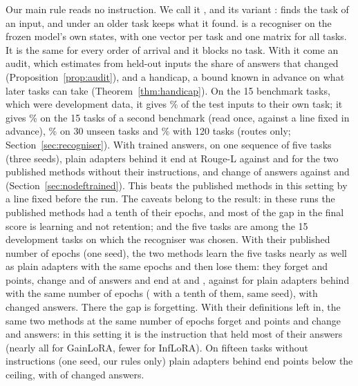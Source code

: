 Our main rule reads no instruction. We call it \recog{}, and its variant \handicap{}: \recog{} finds the
task of an input, and under \handicap{} an older task keeps what it found. \recog{} is a recogniser on the frozen model's own states, with
one vector per task and one matrix for all tasks. It is the same for every order of arrival and it blocks no
task. With it come an audit, which estimates from held-out inputs the share of answers that
changed (Proposition~\ref{prop:audit}), and a handicap, a bound known in advance on what later tasks
can take (Theorem~\ref{thm:handicap}). On the 15 benchmark tasks, which were development data, it
gives \AudDevLLamOneEnd{}\% of the test inputs to their own task; it gives \AudScaleLongThreeEnd{}\%
on the 15 tasks of a second benchmark (read once, against a line fixed in advance),
\AudFreshFourthLEnd{}\% on 30 unseen tasks and
\AudScaleAllHundredTwentyEnd{}\% with 120 tasks (routes only; Section~\ref{sec:recogniser}). With
trained answers, on one sequence of five tasks (three seeds), plain adapters behind it end at
\AudSeedsRidgeAPOne{} Rouge-L against \AudSeedsGainloraAPOne{} and \AudSeedsInfloraAPOne{} for the
two published methods without their instructions, and change \AudSeedsRidgeChanged{} of
\AudSeedsCompared{} answers against \AudSeedsGainloraChanged{} and \AudSeedsInfloraChanged{}
(Section~\ref{sec:nodeftrained}). This beats the published methods in this setting by a line fixed
before the run. The caveats belong to the result: in these runs the published methods had a tenth
of their epochs, and most of the gap in the final score is learning and not retention; and the five
tasks are among the 15 development tasks on which the recogniser was chosen. With their published
number of epochs (one seed), the two methods learn the five tasks nearly as well as plain adapters with the same epochs and
then lose them: they forget \AudFullGainloraFT{} and \AudFullInfloraFT{} points, change
\AudFullGainloraChanged{} and \AudFullInfloraChanged{} of \AudFullCompared{} answers and end at
\AudFullGainloraAP{} and \AudFullInfloraAP{}, against \AudFullOursRidgeAP{} for plain adapters behind
\recog{} with the same number of epochs (\AudOursRidgeAP{} with a tenth of them, same seed), with \AudFullOursRidgeChanged{} changed answers. There the gap is forgetting. With their definitions left in, the same two methods at the same number of epochs forget \AudFullDefOriginalGainloraFT{} and \AudFullDefOriginalInfloraFT{} points and change \AudFullDefOriginalGainloraChanged{} and \AudFullDefOriginalInfloraChanged{} answers: in this setting it is the instruction that held most of their answers (nearly all for GainLoRA, fewer for InfLoRA). On fifteen tasks without instructions (one seed, our rules only) plain adapters behind \recog{} end \AudFifteenNoDefRidgeBelowOwn{} points below the ceiling, with \AudFifteenNoDefRidgeChanged{} of \AudFifteenNoDefCompared{} changed answers.

